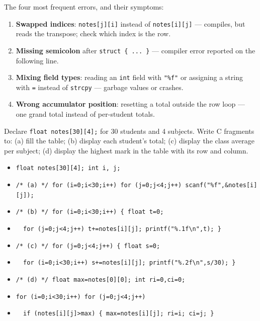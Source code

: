 \documentclass[11pt]{article}
\begin{document}
\begin{attention}
The four most frequent errors, and their symptoms:
\begin{enumerate}
\item \textbf{Swapped indices}: \texttt{notes[j][i]} instead of \texttt{notes[i][j]} --- compiles, but reads the transpose; check which index is the row.
\item \textbf{Missing semicolon} after \texttt{struct \{ ... \}} --- compiler error reported on the following line.
\item \textbf{Mixing field types}: reading an \texttt{int} field with \texttt{"\%f"} or assigning a string with \texttt{=} instead of \texttt{strcpy} --- garbage values or crashes.
\item \textbf{Wrong accumulator position}: resetting a total outside the row loop --- one grand total instead of per-student totals.
\end{enumerate}
\end{attention}

\begin{exercice}
Declare \texttt{float notes[30][4];} for 30 students and 4 subjects. Write C fragments to: (a) fill the table; (b) display each student's total; (c) display the class average per subject; (d) display the highest mark in the table with its row and column.
\end{exercice}

\begin{corrige}[Exercise 1]
\begin{itemize}
\item[] \texttt{float notes[30][4]; int i, j;}
\item[] \texttt{/* (a) */ for (i=0;i<30;i++) for (j=0;j<4;j++) scanf("\%f",\&notes[i][j]);}
\item[] \texttt{/* (b) */ for (i=0;i<30;i++) \{ float t=0;}
\item[] \texttt{\ \ for (j=0;j<4;j++) t+=notes[i][j]; printf("\%.1f\textbackslash n",t); \}}
\item[] \texttt{/* (c) */ for (j=0;j<4;j++) \{ float s=0;}
\item[] \texttt{\ \ for (i=0;i<30;i++) s+=notes[i][j]; printf("\%.2f\textbackslash n",s/30); \}}
\item[] \texttt{/* (d) */ float max=notes[0][0]; int ri=0,ci=0;}
\item[] \texttt{for (i=0;i<30;i++) for (j=0;j<4;j++)}
\item[] \texttt{\ \ if (notes[i][j]>max) \{ max=notes[i][j]; ri=i; ci=j; \}}
\end{itemize}
\end{corrige}
\end{document}
